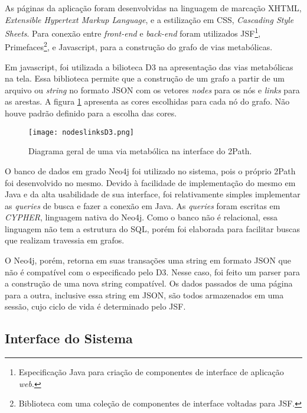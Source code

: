 \indent As páginas da aplicação foram desenvolvidas na linguagem de marcação XHTML, \textit{Extensible Hypertext Markup Language}, e a estilização em CSS, \textit{Cascading Style Sheets}. Para conexão entre \textit{front-end} e \textit{back-end} foram utilizados JSF\footnote{Especificação Java para criação de componentes de interface de aplicação \textit{web}.}, Primefaces\footnote{Biblioteca com uma coleção de componentes de interface voltadas para JSF.}, e Javascript, para a construção do grafo de vias metabólicas.

\indent Em javascript, foi utilizada a bilioteca D3 na apresentação das vias metabólicas na tela. Essa biblioteca permite que a construção de um grafo a partir de um arquivo ou \textit{string} no formato JSON com os vetores \textit{nodes} para os nós e \textit{links} para as arestas. A figura \ref{fig:nodeslinksD3} apresenta as cores escolhidas para cada nó do grafo. Não houve padrão definido para a escolha das cores.

\begin{figure}[!h]
    \centering
    \texttt{[image: nodeslinksD3.png]}
    \caption{Diagrama geral de uma via metabólica na interface do 2Path.}
    \label{fig:nodeslinksD3}
\end{figure}

\indent O banco de dados em grado Neo4j foi utilizado no sistema, pois o próprio 2Path foi desenvolvido no mesmo. Devido à facilidade de implementação do mesmo em Java e da alta usabilidade de sua interface, foi relativamente simples implementar as \textit{queries} de busca e fazer a conexão em Java. As \textit{queries} foram escritas em \textit{CYPHER}, linguagem nativa do Neo4j. Como o banco não é relacional, essa linguagem não tem a estrutura do SQL, porém foi elaborada para facilitar buscas que realizam travessia em grafos. 

\indent O Neo4j, porém, retorna em suas transações uma string em formato JSON que não é compatível com o especificado pelo D3. Nesse caso, foi feito um parser para a construção de uma nova string compatível. Os dados passados de uma página para a outra, inclusive essa string em JSON, são todos armazenados em uma sessão, cujo ciclo de vida é determinado pelo JSF.

\subsection{Interface do Sistema}

